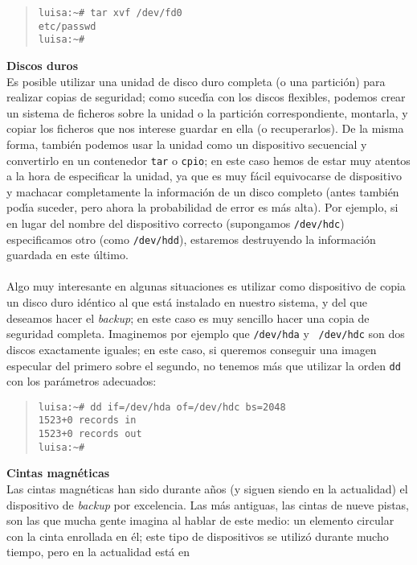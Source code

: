 \begin{quote}
\begin{verbatim}
luisa:~# tar xvf /dev/fd0 
etc/passwd
luisa:~#
\end{verbatim}
\end{quote}
{\bf Discos duros}\\
Es posible utilizar una unidad de disco duro completa (o una partici\'on) 
para realizar copias de seguridad; como suced\'{\i}a con los discos flexibles,
podemos crear un sistema de ficheros sobre la unidad o la partici\'on 
correspondiente, montarla, y copiar los ficheros que nos interese guardar en 
ella (o recuperarlos). De la misma forma, tambi\'en podemos usar la unidad como
un dispositivo secuencial y convertirlo en un contenedor {\tt tar} o {\tt cpio};
en este caso hemos de estar muy atentos a la hora de especificar la unidad, ya
que es muy f\'acil equivocarse de dispositivo y machacar completamente la
informaci\'on de un disco completo (antes tambi\'en pod\'{\i}a suceder, pero
ahora la probabilidad de error es m\'as alta). Por ejemplo, si en lugar del
nombre del dispositivo correcto (supongamos {\tt /dev/hdc}) especificamos otro
(como {\tt /dev/hdd}), estaremos destruyendo la informaci\'on guardada en 
este \'ultimo.\\
\\Algo muy interesante en algunas situaciones es utilizar como dispositivo de
copia un disco duro id\'entico al que est\'a instalado en nuestro sistema, y 
del que deseamos hacer el {\it backup}; en este caso es muy sencillo hacer una
copia de seguridad completa. Imaginemos por ejemplo que {\tt /dev/hda} y {\tt 
/dev/hdc} son
dos discos exactamente iguales; en este caso, si queremos conseguir una
imagen especular del primero sobre el segundo, no tenemos m\'as que utilizar
la orden {\tt dd} con los par\'ametros adecuados:
\begin{quote}
\begin{verbatim}
luisa:~# dd if=/dev/hda of=/dev/hdc bs=2048
1523+0 records in
1523+0 records out
luisa:~#
\end{verbatim}
\end{quote}
{\bf Cintas magn\'eticas}\\
Las cintas magn\'eticas han sido durante a\~nos (y siguen siendo en la 
actualidad) el dispositivo de {\it backup} por excelencia. Las m\'as antiguas,
las cintas de nueve pistas, son las que mucha gente imagina al hablar de este
medio: un elemento circular con la cinta enrollada en \'el; este tipo de 
dispositivos se utiliz\'o durante mucho tiempo, pero en la actualidad est\'a en
